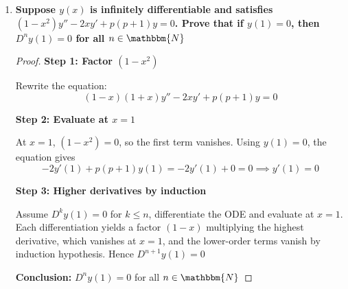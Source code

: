 \documentclass[14pt]{extarticle}
\begin{document}
\begin{enumerate}
\newpage
\item \textbf{Suppose $y(x)$ is infinitely differentiable and satisfies $(1-x^2)y'' - 2xy' + p(p+1)y = 0$. Prove that if $y(1) = 0$, then $D^n y(1) = 0$ for all $n \in \mathbbm{N}$}

\begin{proof}
\textbf{Step 1: Factor $(1-x^2)$}  

Rewrite the equation:
\[
(1-x)(1+x)y'' - 2xy' + p(p+1)y = 0
\]

\textbf{Step 2: Evaluate at $x=1$}  

At $x=1$, $(1-x^2) = 0$, so the first term vanishes. Using $y(1)=0$, the equation gives
\[
-2 y'(1) + p(p+1) y(1) = -2 y'(1) + 0 = 0 \implies y'(1)=0
\]

\textbf{Step 3: Higher derivatives by induction}  

Assume $D^k y(1) = 0$ for $k \le n$, differentiate the ODE and evaluate at $x=1$. Each differentiation yields a factor $(1-x)$ multiplying the highest derivative, which vanishes at $x=1$, and the lower-order terms vanish by induction hypothesis. Hence $D^{n+1} y(1) = 0$

\medskip
\textbf{Conclusion:} $D^n y(1) = 0$ for all $n \in \mathbbm{N}$
\end{proof}

\end{enumerate}
\end{document}
